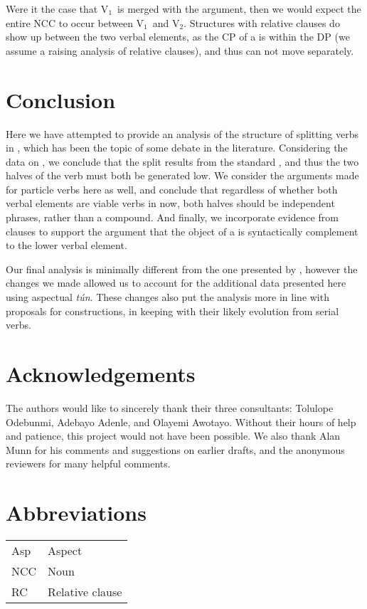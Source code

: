 \documentclass[output=paper,newtxmath,modfonts,nonflat,draftmode]{langsci/langscibook}
\begin{document}
Were it the case that V$_{1}$\ is merged with the argument, then we would expect the entire NCC to occur between V$_{1}$\ and V$_{2}$. 
Structures with relative clauses do show up between the two verbal elements, as the CP of a  is within the DP (we assume a raising analysis of relative clauses), and thus can not move separately.

\section{Conclusion}
\label{sect:parrish:conclusion}

Here we have attempted to provide an analysis of the structure of splitting verbs in , which has been the topic of some debate in the literature. Considering the data on , we conclude that the split results from the standard  , and thus the two halves of the verb must both be generated low. We consider the arguments made for particle verbs here as well, and conclude that regardless of whether both verbal elements are viable verbs in  now, both halves should be independent phrases, rather than a compound. And finally, we incorporate evidence from   clauses to support the argument that the object of a  is syntactically complement to the lower verbal element.

Our final analysis is minimally different from the one presented by \citet{Bode2007}, however the changes we made allowed us to account for the additional data presented here using aspectual \textit{tún}. These changes also put the analysis more in line with proposals for  constructions, in keeping with their likely evolution from serial verbs.

\section*{Acknowledgements}
The authors would like to sincerely thank their three consultants: Tolulope Odebunmi, Adebayo Adenle, and Olayemi Awotayo. Without their hours of help and patience, this project would not have been possible. We also thank Alan Munn for his comments and suggestions on earlier drafts, and the anonymous reviewers for many helpful comments.

\section*{Abbreviations} 
	
	\begin{tabular}{ll}   
		Asp & Aspect \\
		NCC & Noun \isi{complement clause} \\
		RC & Relative clause \\ 
	\end{tabular}
	 

\largerpage 
\printbibliography[heading=subbibliography,notkeyword=this]
\end{document}
